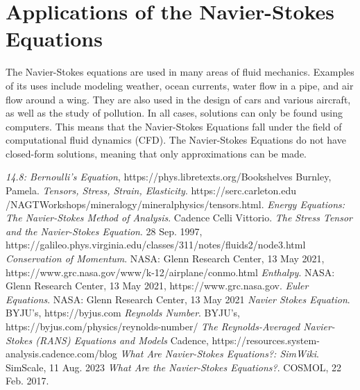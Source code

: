 \documentclass[12pt]{article}
\begin{document}
\section{Applications of the Navier-Stokes Equations}
The Navier-Stokes equations are used in many areas of fluid mechanics. Examples of its uses include modeling weather, ocean currents, water flow in a pipe, and air flow around a wing. They are also used in the design of cars and various aircraft, as well as the study of pollution. In all cases, solutions can only be found using computers. This means that the Navier-Stokes Equations fall under the field of computational fluid dynamics (CFD). The Navier-Stokes Equations do not have closed-form solutions, meaning that only approximations can be made. \newpage
\begin{thebibliography}{15}
{\em 14.8: Bernoulli's Equation},
https://phys.libretexts.org/Bookshelves
Burnley, Pamela. {\em Tensors, Stress, Strain, Elasticity}. https://serc.carleton.edu
/NAGTWorkshops/mineralogy/mineralphysics/tensors.html.
{\em Energy Equations: The Navier-Stokes Method of Analysis}. Cadence
Celli Vittorio. {\em The Stress Tensor and the Navier-Stokes Equation}. 28 Sep. 1997, https://galileo.phys.virginia.edu/classes/311/notes/fluids2/node3.html
{\em Conservation of Momentum}. NASA: Glenn Research Center, 13 May 2021, https://www.grc.nasa.gov/www/k-12/airplane/conmo.html
{\em Enthalpy}. NASA: Glenn Research Center, 13 May 2021, https://www.grc.nasa.gov.
{\em Euler Equations}. NASA: Glenn Research Center, 13 May 2021
{\em Navier Stokes Equation}. BYJU's, https://byjus.com
{\em Reynolds Number}. BYJU's, https://byjus.com/physics/reynolds-number/
{\em The Reynolds-Averaged Navier-Stokes (RANS) Equations and Models} Cadence, https://resources.system-analysis.cadence.com/blog
{\em What Are Navier-Stokes Equations?: SimWiki}. SimScale, 11 Aug. 2023
{\em What Are the Navier-Stokes Equations?}. COSMOL, 22 Feb. 2017.
\end{thebibliography}
\end{document}
